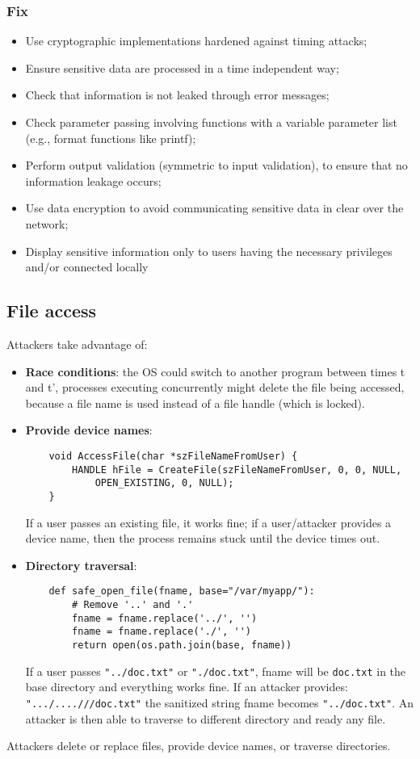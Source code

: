 \documentclass[a4paper, 10pt, titlepage]{article}
\begin{document}
\subsubsection*{Fix}
\begin{itemize}
\item Use cryptographic implementations hardened against timing attacks;
\item Ensure sensitive data are processed in a time independent way;
\item Check that information is not leaked through error messages;
\item Check parameter passing involving functions with a variable parameter list (e.g., format functions like printf);
\item Perform output validation (symmetric to input validation), to ensure that no information leakage occurs;
\item Use data encryption to avoid communicating sensitive data in
clear over the network;
\item Display sensitive information only to users having the necessary privileges and/or connected locally
\end{itemize}

\subsection{File access}
Attackers take advantage of:
\begin{itemize}
\item \textbf{Race conditions}: the OS could switch to another program between times t and t’, processes executing concurrently might delete the file being accessed, because a file name is used instead of a file handle (which is locked).
\item \textbf{Provide device names}: 
\begin{lstlisting}
	void AccessFile(char *szFileNameFromUser) {
		HANDLE hFile = CreateFile(szFileNameFromUser, 0, 0, NULL,
			OPEN_EXISTING, 0, NULL);
	}
\end{lstlisting}
If a user passes an existing file, it works fine; if a user/attacker provides a device name, then the process remains stuck until the device times out. 
\item \textbf{Directory traversal}:
\begin{lstlisting}
	def safe_open_file(fname, base="/var/myapp/"):
		# Remove '..' and '.'
		fname = fname.replace('../', '')
		fname = fname.replace('./', '')
		return open(os.path.join(base, fname))
\end{lstlisting}
If a user passes \lstinline|"../doc.txt"| or \lstinline|"./doc.txt"|, fname will be \lstinline|doc.txt| in the base directory and everything works fine. If an attacker provides: \lstinline|".../....///doc.txt"| the sanitized string fname becomes \lstinline|"../doc.txt"|. An attacker is then able to traverse to different directory and ready any file.
\end{itemize}
Attackers delete or replace files, provide device names, or traverse directories.
\end{document}
